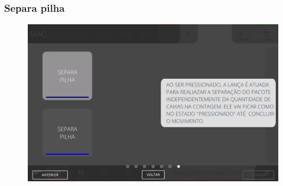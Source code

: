 \newpage
\thispagestyle{fancy}
\vspace*{40 pt}
\subsubsection{\small {Separa pilha}} \label{sec:telaComandosEmpilhador2SeparaPilha}
\vspace*{\fill}
\begin{figure}[h]
    \centering
    \includegraphics[width=576 px,height=360 px]{src/imagesICV/08-stacker/commands/e-12.png}
\end{figure}
\vspace*{\fill}

